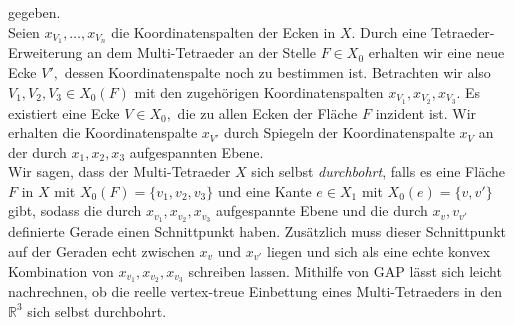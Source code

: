 \documentclass[12pt,titlepage,twoside,cleardoublepage]{article}
\theoremstyle{nummermitklammern}
\numberwithin{equation}{section}
\begin{document}
gegeben.\\
Seien $x_{V_1},\ldots,x_{V_n}$ die Koordinatenspalten der Ecken in $X.$
Durch eine Tetraeder-Erweiterung an dem Multi-Tetraeder an der Stelle $F\in X_0$ erhalten wir eine neue Ecke $V',$ dessen Koordinatenspalte noch zu bestimmen ist. 
Betrachten wir also $V_1,V_2,V_3\in X_0(F)$ mit den zugehörigen Koordinatenspalten $x_{V_1},x_{V_2},x_{V_3}.$ Es existiert eine Ecke $V\in X_0,$ die zu allen Ecken der Fläche $F$ inzident ist. Wir erhalten die Koordinatenspalte $x_{V'}$ durch Spiegeln der Koordinatenspalte $x_V$ an der durch $x_{1},x_{2},x_{3}$ aufgespannten Ebene. \\
Wir sagen, dass der Multi-Tetraeder $X$ sich selbst \emph{durchbohrt}, falls es eine Fläche $F$ in $X$ mit $X_0(F)=\{v_1,v_2,v_3\}$ und eine Kante $e\in X_1$ mit $X_0(e)=\{v,v'\}$ gibt, sodass die durch $x_{v_1},x_{v_2},x_{v_3}$ aufgespannte Ebene und die durch $x_v,v_{v'}$ definierte Gerade  einen Schnittpunkt haben. Zusätzlich muss dieser Schnittpunkt auf der Geraden echt zwischen $x_{v}$ und $x_{v'}$ liegen und sich als eine echte konvex Kombination von $x_{v_1},x_{v_2},x_{v_3}$ schreiben lassen. 
Mithilfe von GAP lässt sich leicht nachrechnen, ob die reelle vertex-treue Einbettung eines Multi-Tetraeders in den $\mathbb{R}^3$ sich selbst durchbohrt.
\end{document}
